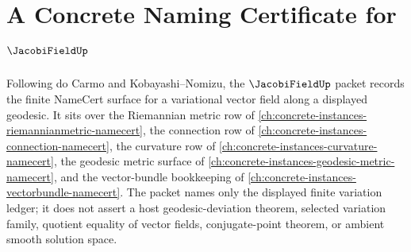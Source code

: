 \chapter{A Concrete Naming Certificate for $\JacobiFieldUp$}
\label{ch:concrete-instances-jacobi-field-namecert}

Following do Carmo and Kobayashi--Nomizu, the $\JacobiFieldUp$ packet records the finite NameCert surface for a variational vector field along a displayed geodesic. It sits over the Riemannian metric row of \autoref{ch:concrete-instances-riemannianmetric-namecert}, the connection row of \autoref{ch:concrete-instances-connection-namecert}, the curvature row of \autoref{ch:concrete-instances-curvature-namecert}, the geodesic metric surface of \autoref{ch:concrete-instances-geodesic-metric-namecert}, and the vector-bundle bookkeeping of \autoref{ch:concrete-instances-vectorbundle-namecert}. The packet names only the displayed finite variation ledger; it does not assert a host geodesic-deviation theorem, selected variation family, quotient equality of vector fields, conjugate-point theorem, or ambient smooth solution space.

